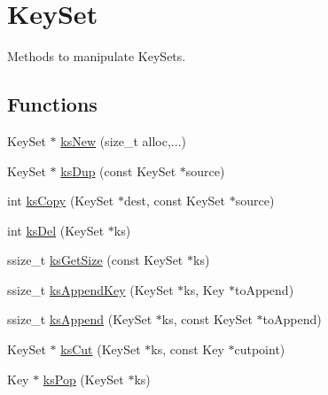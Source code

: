 \hypertarget{group__keyset}{\section{Key\-Set}
\label{group__keyset}
}


Methods to manipulate Key\-Sets.  


\subsection*{Functions}
\begin{DoxyCompactItemize}
\item 
Key\-Set $\ast$ \hyperlink{group__keyset_ga671e1aaee3ae9dc13b4834a4ddbd2c3c}{ks\-New} (size\-\_\-t alloc,...)
\item 
Key\-Set $\ast$ \hyperlink{group__keyset_gac59e4b328245463f1451f68d5106151c}{ks\-Dup} (const Key\-Set $\ast$source)
\item 
int \hyperlink{group__keyset_gaba1f1dbea191f4d7e7eb3e4296ae7d5e}{ks\-Copy} (Key\-Set $\ast$dest, const Key\-Set $\ast$source)
\begin{DoxyCompactList}\small\item\em \end{DoxyCompactList}\item 
int \hyperlink{group__keyset_ga27e5c16473b02a422238c8d970db7ac8}{ks\-Del} (Key\-Set $\ast$ks)
\item 
ssize\-\_\-t \hyperlink{group__keyset_ga7474ad6b0a0fa969dbdf267ba5770eee}{ks\-Get\-Size} (const Key\-Set $\ast$ks)
\item 
ssize\-\_\-t \hyperlink{group__keyset_gaa5a1d467a4d71041edce68ea7748ce45}{ks\-Append\-Key} (Key\-Set $\ast$ks, Key $\ast$to\-Append)
\begin{DoxyCompactList}\small\item\em \end{DoxyCompactList}\item 
ssize\-\_\-t \hyperlink{group__keyset_ga21eb9c3a14a604ee3a8bdc779232e7b7}{ks\-Append} (Key\-Set $\ast$ks, const Key\-Set $\ast$to\-Append)
\begin{DoxyCompactList}\small\item\em \end{DoxyCompactList}\item 
Key\-Set $\ast$ \hyperlink{group__keyset_ga6b00cf82b59af4d883a9bad6cf4a4a4a}{ks\-Cut} (Key\-Set $\ast$ks, const Key $\ast$cutpoint)
\item 
Key $\ast$ \hyperlink{group__keyset_gae42530b04defb772059de0600159cf69}{ks\-Pop} (Key\-Set $\ast$ks)

\end{DoxyCompactItemize}
